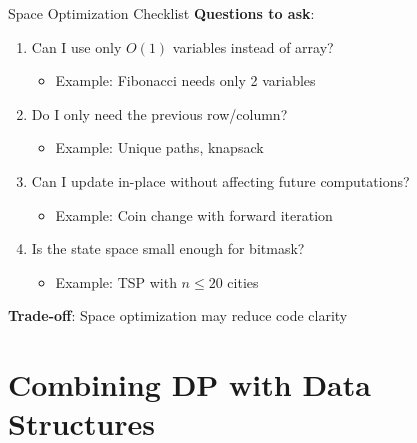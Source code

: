 \documentclass[aspectratio=169]{beamer}
\begin{document}
\begin{frame}{Space Optimization Checklist}
  \textbf{Questions to ask}:

  \vspace{0.3cm}

  \begin{enumerate}
    \item Can I use only $O(1)$ variables instead of array?
    \begin{itemize}
      \item Example: Fibonacci needs only 2 variables
    \end{itemize}

    \vspace{0.2cm}

    \item Do I only need the previous row/column?
    \begin{itemize}
      \item Example: Unique paths, knapsack
    \end{itemize}

    \vspace{0.2cm}

    \item Can I update in-place without affecting future computations?
    \begin{itemize}
      \item Example: Coin change with forward iteration
    \end{itemize}

    \vspace{0.2cm}

    \item Is the state space small enough for bitmask?
    \begin{itemize}
      \item Example: TSP with $n \leq 20$ cities
    \end{itemize}
  \end{enumerate}

  \vspace{0.5cm}

  \textbf{Trade-off}: Space optimization may reduce code clarity
\end{frame}

\section{Combining DP with Data Structures}
\end{document}
